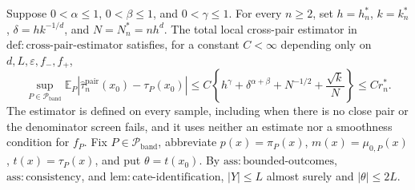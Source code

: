 Suppose \(0<\alpha\leq1\), \(0<\beta\leq1\), and \(0<\gamma\leq1\).  For every \(n\geq2\), set \(h=h_n^*\), \(k=k_n^*\), \(\delta=h k^{-1/d}\), and \(N=N_n^*=nh^d\).  The total local cross-pair estimator in \(\mathrm{def:cross\mbox{-}pair\mbox{-}estimator}\) satisfies, for a constant \(C<\infty\) depending only on \(d,L,\varepsilon,f_{-},f_{+}\),
\[
 \sup_{P\in\mathcal P_{\mathrm{band}}}
 \mathbb E_P\left|\widehat\tau_n^{\mathrm{pair}}(x_0)-\tau_P(x_0)\right|
 \leq C\left\{h^\gamma+\delta^{\alpha+\beta}+N^{-1/2}+\frac{\sqrt{k}}{N}\right\}
 \leq C r_n^*.
\]
The estimator is defined on every sample, including when there is no close pair or the denominator screen fails, and it uses neither an estimate nor a smoothness condition for \(f_P\).
Fix \(P\in\mathcal P_{\mathrm{band}}\), abbreviate \(p(x)=\pi_P(x)\), \(m(x)=\mu_{0,P}(x)\), \(t(x)=\tau_P(x)\), and put \(\theta=t(x_0)\).  By \(\mathrm{ass:bounded\mbox{-}outcomes}\), \(\mathrm{ass:consistency}\), and \(\mathrm{lem:cate\mbox{-}identification}\), \(|Y|\leq L\) almost surely and \(|\theta|\leq2L\).

